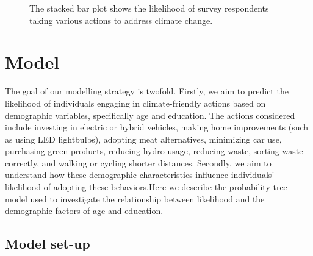 \documentclass[
  letterpaper,
  DIV=11,
  numbers=noendperiod]{scrartcl}
\begin{document}
\begin{figure}


\caption{\label{fig-five}The stacked bar plot shows the likelihood of
survey respondents taking various actions to address climate change.}

\end{figure}%

\section{Model}\label{sec-model}

The goal of our modelling strategy is twofold. Firstly, we aim to
predict the likelihood of individuals engaging in climate-friendly
actions based on demographic variables, specifically age and education.
The actions considered include investing in electric or hybrid vehicles,
making home improvements (such as using LED lightbulbs), adopting meat
alternatives, minimizing car use, purchasing green products, reducing
hydro usage, reducing waste, sorting waste correctly, and walking or
cycling shorter distances. Secondly, we aim to understand how these
demographic characteristics influence individuals' likelihood of
adopting these behaviors.Here we describe the probability tree model
used to investigate the relationship between likelihood and the
demographic factors of age and education.

\subsection{Model set-up}\label{model-set-up}
\end{document}
